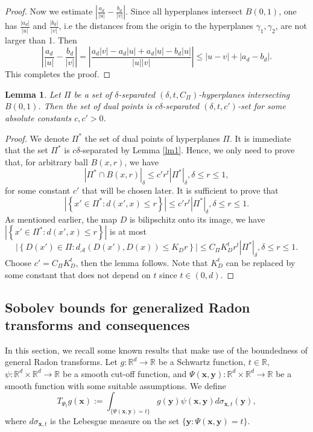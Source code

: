 \documentclass[11pt]{article}
\newtheorem{lemma}[theorem]{Lemma}
\newcommand{\1}{\mathbf{1}}
\begin{document}
\begin{proof}
    Now we estimate $\left|\frac{a_d}{|u|}-\frac{b_d}{|v|}\right|$. Since all hyperplanes intersect $B(0, 1)$, one has $\frac{|a_d|}{|u|}$ and $\frac{|b_d|}{|v|}$, i.e the distances from the origin to the hyperplanes $\gamma_1,\gamma_2$, are not larger than 1. Then
    \[\left|\dfrac{a_d}{|u|}-\dfrac{b_d}{|v|}\right| = \left|\dfrac{a_d|v|-a_d|u|+a_d|u|-b_d|u|}{|u||v|}\right| \le |u-v| +|a_d-b_d|.\]
    This completes the proof.
\end{proof}
\begin{lemma}\label{lm2}
    Let $\Pi$ be a set of $\delta$-separated $(\delta, t, C_{\Pi})$-hyperplanes intersecting $B(0, 1)$. Then the set of dual points is $c\delta$-separated $(\delta, t, c')$-set for some absolute constants $c, c'>0$.
\end{lemma}
\begin{proof}
    We denote $\Pi^*$ the set of dual points of hyperplanes $\Pi$. It is immediate that the set $\Pi^*$ is $c\delta$-separated by Lemma \ref{lm1}. Hence, we only need to prove that, for arbitrary ball $B(x,r)$, we have
    \[|\Pi^*\cap B(x, r)|_\delta \le c' r^t|\Pi^*|_\delta, \delta\le r\le 1,\]
    for some constant $c'$ that will be chosen later.  It is sufficient to prove that
    \[|\left\lbrace  x' \in \Pi^*: d(x',x) \le r\right\rbrace| \le c'r^t|\Pi^*|_{\delta}, \delta\le r\le 1.\]
    As mentioned earlier, the map $D$ is bilipschitz onto its image, we have $|\left\lbrace  x' \in \Pi^*: d(x',x) \le r\right\rbrace|$ is at most
    \[\left|\left\lbrace  D(x')\in \Pi : d_\mathcal{A}(D(x'),D(x)) \le K_Dr\right\rbrace\right| \le C_\Pi K_D^t r^t|\Pi^*|_\delta, \delta\le r\le 1.\]
    Choose $c'=C_\Pi K_D^{t}$, then the lemma follows. Note that $K_D^t$ can be replaced by some constant that does not depend on $t$ since $t\in (0, d)$.
\end{proof}
\subsection{Sobolev bounds for generalized Radon transforms and consequences}

In this section, we recall some known results that make use of the boundedness of general Radon transforms. Let $g\colon \mathbb{R}^d\to \mathbb{R}$ be a Schwartz function, $t\in \mathbb{R}$, $\psi\colon \mathbb R^d \times \mathbb R^d \rightarrow \mathbb R$ be a smooth cut-off function, and   $ \Psi(\mathbf{x}, \mathbf{y}) : \mathbb R^d \times \mathbb R^d \rightarrow \mathbb R$ be a  smooth function with some suitable assumptions. We define
\[T_{\Psi_t}g(\mathbf{x}):=\int_{\{\Psi(\mathbf{x}, \mathbf{y})=t\}}g(\mathbf{y})\psi(\mathbf{x}, \mathbf{y})d\sigma_{\mathbf{x}, t}(\mathbf{y}),\]
where $d\sigma_{\mathbf{x}, t}$ is the Lebesgue measure on the set $\{\mathbf{y}\colon \Psi(\mathbf{x}, \mathbf{y})=t\}.$
\end{document}
